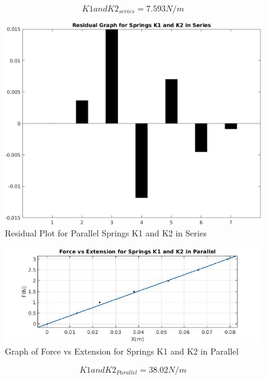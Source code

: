 $$ {K1 and K2}_{series} = 7.593 N/m $$

\begin{center}
\begin{figure}[h!]
    \centering
    \includegraphics[width=\textwidth]{figures/K1_K2_Series_R.png}
    \caption{Residual Plot for Parallel Springs K1 and K2 in Series}
    \label{fig:k1_Se_R}
\end{figure}
\end{center}

\newpage
\begin{center}
\begin{figure}[h!]
    \centering
    \includegraphics[width=\textwidth]{figures/K1_K2_Parallel.jpg}
    \caption{Graph of Force vs Extension for Springs K1 and K2 in Parallel}
    \label{fig:k1_Se_R}
\end{figure}
\end{center}

$$ {K1 and K2}_{Parallel} = 38.02 N/m $$


